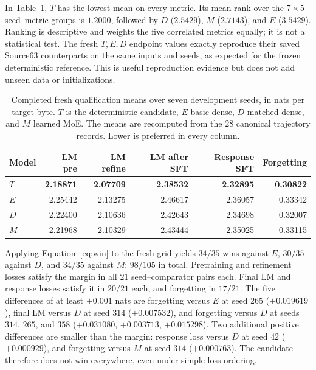 \documentclass{article}
\begin{document}
In Table~\ref{tab:freshmeans}, $T$ has the lowest mean on every metric. Its mean rank over the $7\times5$ seed--metric groups is $1.2000$, followed by $D$ ($2.5429$), $M$ ($2.7143$), and $E$ ($3.5429$). Ranking is descriptive and weights the five correlated metrics equally; it is not a statistical test. The fresh $T,E,D$ endpoint values exactly reproduce their saved Source63 counterparts on the same inputs and seeds, as expected for the frozen deterministic reference. This is useful reproduction evidence but does not add unseen data or initializations.

\begin{table}[t]
\centering
\caption{Completed fresh qualification means over seven development seeds, in nats per target byte. $T$ is the deterministic candidate, $E$ basic dense, $D$ matched dense, and $M$ learned MoE. The means are recomputed from the $28$ canonical trajectory records. Lower is preferred in every column.}
\label{tab:freshmeans}
\begin{tabular}{lrrrrr}
\toprule
Model & LM pre & LM refine & LM after SFT & Response SFT & Forgetting\\
\midrule
$T$ & \textbf{2.18871} & \textbf{2.07709} & \textbf{2.38532} & \textbf{2.32895} & \textbf{0.30822}\\
$E$ & 2.25442 & 2.13275 & 2.46617 & 2.36057 & 0.33342\\
$D$ & 2.22400 & 2.10636 & 2.42643 & 2.34698 & 0.32007\\
$M$ & 2.21968 & 2.10329 & 2.43444 & 2.35025 & 0.33115\\
\bottomrule
\end{tabular}
\end{table}

Applying Equation~\ref{eq:win} to the fresh grid yields $34/35$ wins against $E$, $30/35$ against $D$, and $34/35$ against $M$: $98/105$ in total. Pretraining and refinement losses satisfy the margin in all $21$ seed--comparator pairs each. Final LM and response losses satisfy it in $20/21$ each, and forgetting in $17/21$. The five differences of at least $+0.001$ nats are forgetting versus $E$ at seed $265$ ($+0.019619$), final LM versus $D$ at seed $314$ ($+0.007532$), and forgetting versus $D$ at seeds $314$, $265$, and $358$ ($+0.031080$, $+0.003713$, $+0.015298$). Two additional positive differences are smaller than the margin: response loss versus $D$ at seed $42$ ($+0.000929$), and forgetting versus $M$ at seed $314$ ($+0.000763$). The candidate therefore does not win everywhere, even under simple loss ordering.
\end{document}
